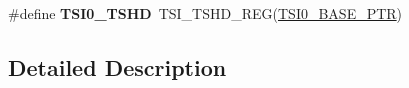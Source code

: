 \begin{DoxyCompactItemize}
\item 
\hypertarget{group___t_s_i___register___accessor___macros_ga8a7a92091c84eb3bddf218fa540d611f}{}\#define {\bfseries T\+S\+I0\+\_\+\+T\+S\+H\+D}~T\+S\+I\+\_\+\+T\+S\+H\+D\+\_\+\+R\+E\+G(\hyperlink{group___t_s_i___peripheral_gaf98ea1cd15559446e0cfc1ae177751f6}{T\+S\+I0\+\_\+\+B\+A\+S\+E\+\_\+\+P\+T\+R})\label{group___t_s_i___register___accessor___macros_ga8a7a92091c84eb3bddf218fa540d611f}

\end{DoxyCompactItemize}


\subsection{Detailed Description}
